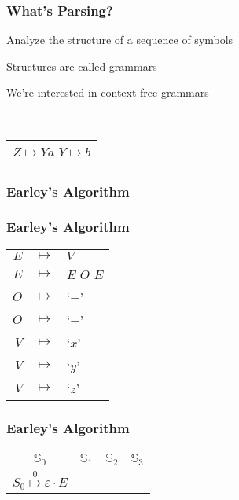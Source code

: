 \documentclass{beamer}
\newcommand{\earley}[4]{#1\overset{#4}{\mapsto}#2\cdot#3}
\newcommand{\St}[1]{\mathbb{S}_{#1}}
\begin{document}
	\begin{frame}
		\frametitle{What's Parsing?}

		\begin{itemize*}
			\item Analyze the structure of a sequence of symbols
			\item Structures are called grammars
			\item We're interested in context-free grammars
		\end{itemize*}\\
		\vspace{0.5cm}
		\centering
		\begin{tabular}{c}
			$Z \mapsto Ya$ 
			$Y \mapsto b$ 
		\end{tabular}
		\vspace{2cm}
	\end{frame}


	\begin{frame}
		\frametitle{Earley's Algorithm}
	\end{frame}

	\begin{frame}
		\frametitle{Earley's Algorithm}
		\centering
		\begin{tabular}{rcl}
			$E$ & $ \mapsto $ & $V$ \\
			$E$ & $ \mapsto $ & $E$ $O$ $E$ \\
			$O$ & $ \mapsto $ & `$+$' \\
			$O$ & $ \mapsto $ & `$-$' \\
			$V$ & $ \mapsto $ & `$x$' \\
			$V$ & $ \mapsto $ & `$y$' \\
			$V$ & $ \mapsto $ & `$z$'
		\end{tabular}
	\end{frame}

	\begin{frame}
		\frametitle{Earley's Algorithm}
		\centering
		\begin{tabular}{|c|c|c|c|}
			\hline
			$\St{0}$ & $\St{1}$ & $\St{2}$ & $\St{3}$ \\
			\hline
			$\earley{S_0}{\varepsilon}{E}{0}$ & & & \\
			\hline
		\end{tabular}
	\end{frame}
\end{document}
